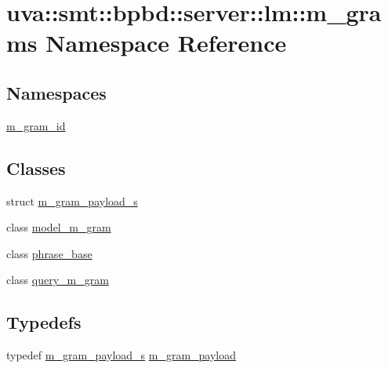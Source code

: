 \hypertarget{namespaceuva_1_1smt_1_1bpbd_1_1server_1_1lm_1_1m__grams}{}\section{uva\+:\+:smt\+:\+:bpbd\+:\+:server\+:\+:lm\+:\+:m\+\_\+grams Namespace Reference}
\label{namespaceuva_1_1smt_1_1bpbd_1_1server_1_1lm_1_1m__grams}
\subsection*{Namespaces}
\begin{DoxyCompactItemize}
\item 
 \hyperlink{namespaceuva_1_1smt_1_1bpbd_1_1server_1_1lm_1_1m__grams_1_1m__gram__id}{m\+\_\+gram\+\_\+id}
\end{DoxyCompactItemize}
\subsection*{Classes}
\begin{DoxyCompactItemize}
\item 
struct \hyperlink{structuva_1_1smt_1_1bpbd_1_1server_1_1lm_1_1m__grams_1_1m__gram__payload__s}{m\+\_\+gram\+\_\+payload\+\_\+s}
\item 
class \hyperlink{classuva_1_1smt_1_1bpbd_1_1server_1_1lm_1_1m__grams_1_1model__m__gram}{model\+\_\+m\+\_\+gram}
\item 
class \hyperlink{classuva_1_1smt_1_1bpbd_1_1server_1_1lm_1_1m__grams_1_1phrase__base}{phrase\+\_\+base}
\item 
class \hyperlink{classuva_1_1smt_1_1bpbd_1_1server_1_1lm_1_1m__grams_1_1query__m__gram}{query\+\_\+m\+\_\+gram}
\end{DoxyCompactItemize}
\subsection*{Typedefs}
\begin{DoxyCompactItemize}
\item 
typedef \hyperlink{structuva_1_1smt_1_1bpbd_1_1server_1_1lm_1_1m__grams_1_1m__gram__payload__s}{m\+\_\+gram\+\_\+payload\+\_\+s} \hyperlink{namespaceuva_1_1smt_1_1bpbd_1_1server_1_1lm_1_1m__grams_a1422aa6b3f3cb9377916d20e9bf16c0a}{m\+\_\+gram\+\_\+payload}
\end{DoxyCompactItemize}
